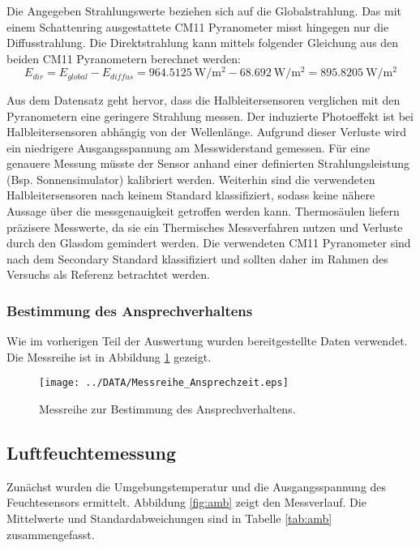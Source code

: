 Die Angegeben Strahlungswerte beziehen sich auf die Globalstrahlung. Das mit einem Schattenring ausgestattete CM11 Pyranometer misst hingegen nur die Diffusstrahlung. Die Direktstrahlung kann mittels folgender Gleichung aus den beiden CM11 Pyranometern berechnet werden:
\begin{equation}
	\label{eq:Edir}
	E_{dir}=E_{global}-E_{diffus}=\SI{964.5125}{\watt\per\square\meter}-\SI{68.692}{\watt\per\square\meter} = \SI{895.8205}{\watt\per\square\meter}
\end{equation}

Aus dem Datensatz geht hervor, dass die Halbleitersensoren verglichen mit den Pyranometern eine geringere Strahlung messen. Der induzierte Photoeffekt ist bei Halbleitersensoren abhängig von der Wellenlänge. Aufgrund dieser Verluste wird ein niedrigere Ausgangsspannung am Messwiderstand gemessen. Für eine genauere Messung müsste der Sensor anhand einer definierten Strahlungsleistung (Bsp. Sonnensimulator) kalibriert werden. Weiterhin sind die verwendeten Halbleitersensoren nach keinem Standard klassifiziert, sodass keine nähere Aussage über die messgenauigkeit getroffen werden kann. Thermosäulen liefern präzisere Messwerte, da sie ein Thermisches Messverfahren nutzen und Verluste durch den Glasdom gemindert werden. Die verwendeten CM11 Pyranometer sind nach dem Secondary Standard klassifiziert und sollten daher im Rahmen des Versuchs als Referenz betrachtet werden.


\subsubsection{Bestimmung des Ansprechverhaltens}
Wie im vorherigen Teil der Auswertung wurden bereitgestellte Daten verwendet. Die Messreihe ist in Abbildung \ref{fig:response} gezeigt.
\begin{figure}[H]
	\centering
	\texttt{[image: ../DATA/Messreihe\_Ansprechzeit.eps]}
	\caption[Messreihe zur Bestimmung des Ansprechverhaltens.]{Messreihe zur Bestimmung des Ansprechverhaltens.}
	\label{fig:response}
\end{figure}

\subsection{Luftfeuchtemessung}
Zunächst wurden die Umgebungstemperatur und die Ausgangsspannung des Feuchtesensors ermittelt. Abbildung \ref{fig:amb} zeigt den Messverlauf. Die Mittelwerte und Standardabweichungen sind in Tabelle \ref{tab:amb} zusammengefasst.

